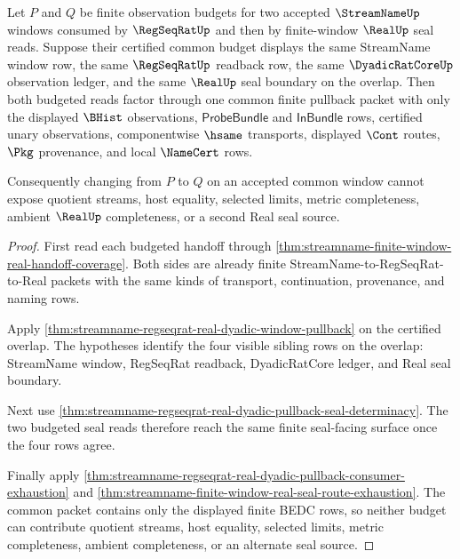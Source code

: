 \begin{theorem}
\label{thm:streamname-regseqrat-real-budgeted-common-pullback}
Let $P$ and $Q$ be finite observation budgets for two accepted $\StreamNameUp$ windows consumed by $\RegSeqRatUp$ and then by finite-window $\RealUp$ seal reads. Suppose their certified common budget displays the same StreamName window row, the same $\RegSeqRatUp$ readback row, the same $\DyadicRatCoreUp$ observation ledger, and the same $\RealUp$ seal boundary on the overlap. Then both budgeted reads factor through one common finite pullback packet with only the displayed $\BHist$ observations, $\mathsf{ProbeBundle}$ and $\mathsf{InBundle}$ rows, certified unary observations, componentwise $\hsame$ transports, displayed $\Cont$ routes, $\Pkg$ provenance, and local $\NameCert$ rows.

Consequently changing from $P$ to $Q$ on an accepted common window cannot expose quotient streams, host equality, selected limits, metric completeness, ambient $\RealUp$ completeness, or a second Real seal source.
\end{theorem}
\begin{proof}
First read each budgeted handoff through \autoref{thm:streamname-finite-window-real-handoff-coverage}. Both sides are already finite StreamName-to-RegSeqRat-to-Real packets with the same kinds of transport, continuation, provenance, and naming rows.

Apply \autoref{thm:streamname-regseqrat-real-dyadic-window-pullback} on the certified overlap. The hypotheses identify the four visible sibling rows on the overlap: StreamName window, RegSeqRat readback, DyadicRatCore ledger, and Real seal boundary.

Next use \autoref{thm:streamname-regseqrat-real-dyadic-pullback-seal-determinacy}. The two budgeted seal reads therefore reach the same finite seal-facing surface once the four rows agree.

Finally apply \autoref{thm:streamname-regseqrat-real-dyadic-pullback-consumer-exhaustion} and \autoref{thm:streamname-finite-window-real-seal-route-exhaustion}. The common packet contains only the displayed finite BEDC rows, so neither budget can contribute quotient streams, host equality, selected limits, metric completeness, ambient completeness, or an alternate seal source.
\end{proof}

